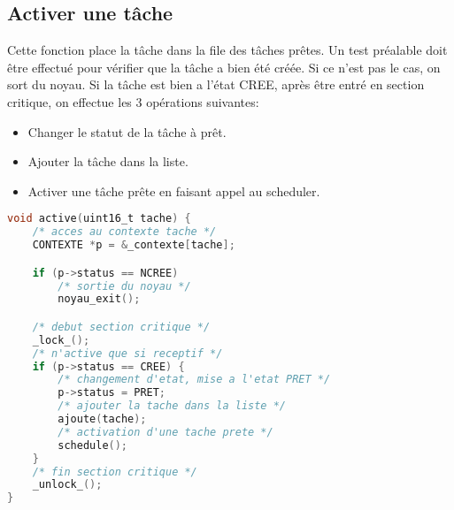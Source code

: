 \subsection{Activer une tâche}
Cette fonction place la tâche dans la file des tâches prêtes.
Un test préalable doit être effectué pour vérifier que la tâche a bien été créée. Si ce n'est pas le cas, on sort du noyau. Si la tâche est bien a l'état CREE, après être entré en section critique, on effectue les 3 opérations suivantes:
\begin{itemize}
    \item Changer le statut de la tâche à prêt.
    \item Ajouter la tâche dans la liste.
    \item Activer une tâche prête en faisant appel au scheduler.
\end{itemize}
\begin{lstlisting}[language=C, caption=noyau.c]
void active(uint16_t tache) {
    /* acces au contexte tache */
    CONTEXTE *p = &_contexte[tache];

    if (p->status == NCREE)
        /* sortie du noyau */
        noyau_exit();

    /* debut section critique */
    _lock_();
    /* n'active que si receptif */
    if (p->status == CREE) {
        /* changement d'etat, mise a l'etat PRET */
        p->status = PRET;
        /* ajouter la tache dans la liste */
        ajoute(tache);
        /* activation d'une tache prete */
        schedule();
    }
    /* fin section critique */
    _unlock_();
}
\end{lstlisting}


